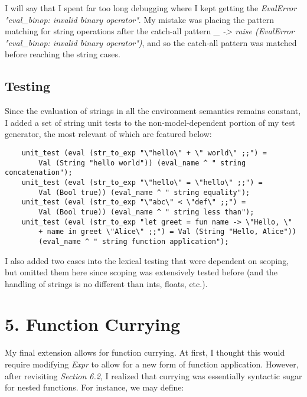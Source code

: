 \documentclass[12pt]{article}
\begin{document}
I will say that I spent far too long debugging where I kept getting the \textit{EvalError "eval\_binop: invalid binary operator"}. My mistake was placing the pattern matching for string operations after the catch-all pattern \textit{\_ -> raise (EvalError "eval\_binop: invalid binary operator")}, and so the catch-all pattern was matched before reaching the string cases.

\subsection*{Testing}
Since the evaluation of strings in all the environment semantics remains constant, I added a set of string unit tests to the non-model-dependent portion of my test generator, the most relevant of which are featured below:
\begin{verbatim}
    unit_test (eval (str_to_exp "\"hello\" + \" world\" ;;") = 
        Val (String "hello world")) (eval_name ^ " string concatenation");
    unit_test (eval (str_to_exp "\"hello\" = \"hello\" ;;") = 
        Val (Bool true)) (eval_name ^ " string equality");
    unit_test (eval (str_to_exp "\"abc\" < \"def\" ;;") = 
        Val (Bool true)) (eval_name ^ " string less than");
    unit_test (eval (str_to_exp "let greet = fun name -> \"Hello, \" 
        + name in greet \"Alice\" ;;") = Val (String "Hello, Alice")) 
        (eval_name ^ " string function application");
\end{verbatim}

I also added two cases into the lexical testing that were dependent on scoping, but omitted them here since scoping was extensively tested before (and the handling of strings is no different than ints, floats, etc.).

\section*{5. Function Currying}
My final extension allows for function currying. At first, I thought this would require modifying \textit{Expr} to allow for a new form of function application. 
However, after revisiting \textit{Section 6.2}, I realized that currying was essentially syntactic sugar for nested functions. For instance, we may define:
\end{document}
